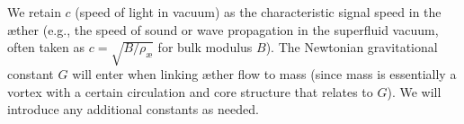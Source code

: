 We retain $c$ (speed of light in vacuum) as the characteristic signal speed in the æther (e.g., the speed of sound or wave propagation in the superfluid vacuum, often taken as $c = \sqrt{B/\rho_{\text{\ae}}}$ for bulk modulus $B$). The Newtonian gravitational constant $G$ will enter when linking æther flow to mass (since mass is essentially a vortex with a certain circulation and core structure that relates to $G$). We will introduce any additional constants as needed.